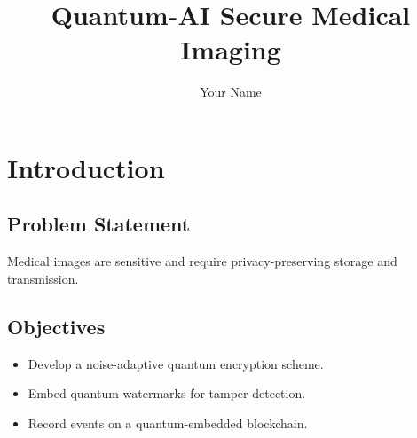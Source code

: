 \documentclass[11pt,a4paper]{report}
\title{Quantum-AI Secure Medical Imaging}
\author{Your Name}
\begin{document}
\maketitle
\chapter{Introduction}
\section{Problem Statement}
Medical images are sensitive and require privacy-preserving storage and transmission.
\section{Objectives}
\begin{itemize}
  \item Develop a noise-adaptive quantum encryption scheme.
  \item Embed quantum watermarks for tamper detection.
  \item Record events on a quantum-embedded blockchain.
\end{itemize}
\end{document}
